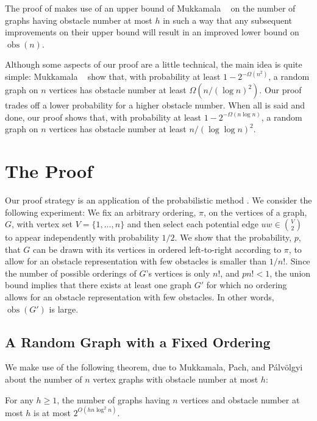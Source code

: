 \documentclass{patmorin}
\DeclareMathOperator{\obs}{obs}
\renewcommand{\note}[1]{}
\begin{document}
The proof of  makes use of an upper bound of Mukkamala \etal\
\cite[Theorem~1]{mukkamala.pach.ea:lower} on the number of graphs having
obstacle number at most $h$ in such a way that any subsequent improvements
on their upper bound will result in an improved lower bound on $\obs(n)$.

Although some aspects of our proof are a little technical, the main
idea is quite simple:  Mukkamala \etal\ \cite{mukkamala.pach.ea:lower}
show that, with probability at least $1-2^{-\Omega(n^2)}$, a random
graph on $n$ vertices has obstacle number at least $\Omega(n/(\log n)^2)$.
Our proof trades off a lower probability for a higher obstacle number.
When all is said and done, our proof shows that, with probability at least
$1-2^{-\Omega(n\log n)}$, a random graph on $n$ vertices has obstacle
number at least $n/(\log\log n)^2$.

\section{The Proof}

Our proof strategy is an application of the probabilistic method
\cite{alon.spencer:probabilistic}.  We consider the following experiment:
We fix an arbitrary ordering, $\pi$, on the vertices of a graph, $G$,
with vertex set $V=\{1,\ldots,n\}$ and then select each potential edge
$uw\in\binom{V}{2}$ to appear independently with probability $1/2$.
We show that the probability, $p$, that $G$ can be drawn with its
vertices in ordered left-to-right according to $\pi$, to allow for
an obstacle representation with few obstacles is smaller than $1/n!$.
Since the number of possible orderings of $G$'s vertices is only $n!$,
and $pn!<1$, the union bound implies that there exists at least one
graph $G'$ for which no ordering allows for an obstacle representation
with few obstacles.  In other words, $\obs(G')$ is large.

\subsection{A Random Graph with a Fixed Ordering}

We make use of the following theorem, due to Mukkamala, Pach, and
P\'alv\"olgyi \cite[Theorem~1]{mukkamala.pach.ea:lower} about the number
of $n$ vertex graphs with obstacle number at most $h$:\note{We do need $h\ge 1$. With $h=0$, the upper bound is $O(1)$, but there are $n+1$ graphs with
\textbf{at most} $n$ vertices and obstacle number 0.}
\begin{thm}
  For any $h\ge 1$, the number of graphs having $n$ vertices and
  obstacle number at most $h$ is at most $2^{O(hn\log^2 n)}$.
\end{thm}
\end{document}
